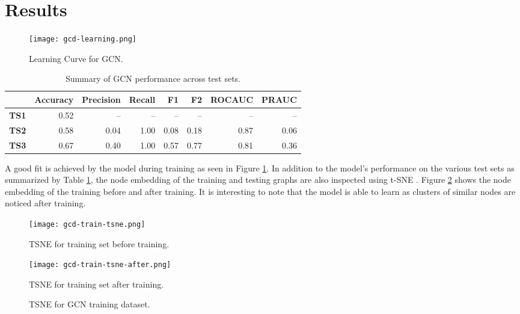 \section{Results}
\label{sec:gcd-disc}

\begin{figure}[htb]
  \centering
    \texttt{[image: gcd-learning.png]}
    \caption{Learning Curve for GCN.}
  \label{fig:gcn-learning}
\end{figure}

\begin{table}[htb]
  \centering
  \caption{Summary of GCN performance across test sets.}
  \begin{tabular}{lrrrrrrr}
    \hline
    & Accuracy & Precision & Recall & F1 & F2 & ROCAUC & PRAUC \\
    \hline
    \textbf{TS1} & 0.52 & -- & -- & -- & -- & -- & -- \\
    \textbf{TS2} & 0.58 & 0.04 & 1.00 & 0.08 & 0.18 & 0.87 & 0.06 \\
    \textbf{TS3} & 0.67 & 0.40 & 1.00 & 0.57 & 0.77 & 0.81 & 0.36 \\
    \hline
  \end{tabular}
  \label{tab:gcn-results}
\end{table}

A good fit is achieved by the model during training as seen in Figure
\ref{fig:gcn-learning}. In addition to the model's performance on the
various test sets as summarized by Table \ref{tab:gcn-results}, the
node embedding of the training and testing graphs are also inspected
using t-SNE \cite{maaten2008visualizing}. Figure
\ref{fig:gcn-train-tsne} shows the node embedding of the training
before and after training. It is interesting to note that the model is
able to learn as clusters of similar nodes are noticed after training.

\begin{figure}[htb]
  \centering
  \begin{minipage}{0.49\textwidth}
    \centering
    \texttt{[image: gcd-train-tsne.png]}
    \caption{TSNE for training set before training.}
  \end{minipage}
  \begin{minipage}{0.49\textwidth}
    \centering
    \texttt{[image: gcd-train-tsne-after.png]}
    \caption{TSNE for training set after training.}
  \end{minipage}
  \caption{TSNE for GCN training dataset.}
  \label{fig:gcn-train-tsne}
\end{figure}

